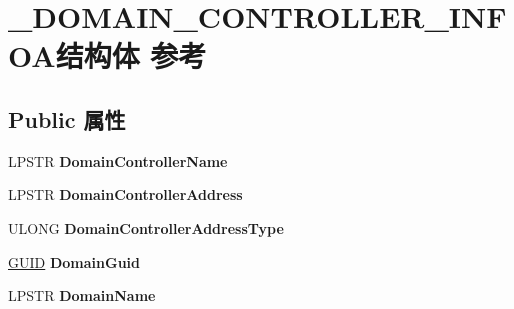 \hypertarget{struct___d_o_m_a_i_n___c_o_n_t_r_o_l_l_e_r___i_n_f_o_a}{}\section{\+\_\+\+D\+O\+M\+A\+I\+N\+\_\+\+C\+O\+N\+T\+R\+O\+L\+L\+E\+R\+\_\+\+I\+N\+F\+O\+A结构体 参考}
\label{struct___d_o_m_a_i_n___c_o_n_t_r_o_l_l_e_r___i_n_f_o_a}
\subsection*{Public 属性}
\begin{DoxyCompactItemize}
\item 
\mbox{\label{struct___d_o_m_a_i_n___c_o_n_t_r_o_l_l_e_r___i_n_f_o_a_a10486236af8256d7c25a2a04eec556df}} 
L\+P\+S\+TR {\bfseries Domain\+Controller\+Name}
\item 
\mbox{\label{struct___d_o_m_a_i_n___c_o_n_t_r_o_l_l_e_r___i_n_f_o_a_aed2035f4c6c275ea516f997d7bff7f37}} 
L\+P\+S\+TR {\bfseries Domain\+Controller\+Address}
\item 
\mbox{\label{struct___d_o_m_a_i_n___c_o_n_t_r_o_l_l_e_r___i_n_f_o_a_a4a3361240db44164d39ea5b054509fbe}} 
U\+L\+O\+NG {\bfseries Domain\+Controller\+Address\+Type}
\item 
\mbox{\label{struct___d_o_m_a_i_n___c_o_n_t_r_o_l_l_e_r___i_n_f_o_a_a374a201f0ba22a1cb9d5042f75dfce48}} 
\hyperlink{interface_g_u_i_d}{G\+U\+ID} {\bfseries Domain\+Guid}
\item 
\mbox{\label{struct___d_o_m_a_i_n___c_o_n_t_r_o_l_l_e_r___i_n_f_o_a_a6d4fd23836de6fda081ed793be0e45c7}} 
L\+P\+S\+TR {\bfseries Domain\+Name}
\item 
\mbox{\label{struct___d_o_m_a_i_n___c_o_n_t_r_o_l_l_e_r___i_n_f_o_a_a166ffc70bca57703aed3c10ef0c99d7d}} 

\end{DoxyCompactItemize}
